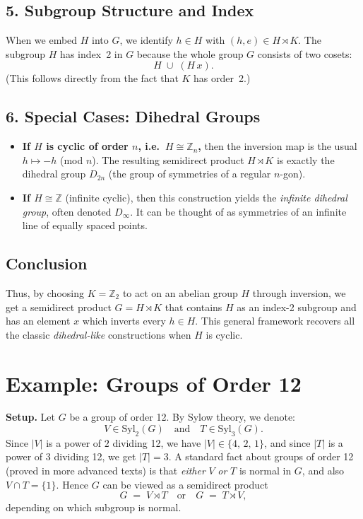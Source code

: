 \documentclass[12pt]{article}
\theoremstyle{definition} %
\theoremstyle{plain} %
\begin{document}
\subsection*{5. Subgroup Structure and Index}

When we embed $H$ into $G$, we identify $h \in H$ with $(h,e)\in H \rtimes K$. 
The subgroup $H$ has index~2 in $G$ because the whole group $G$ consists of two cosets:
\[
  H \;\cup\; (H\,x).
\]
(This follows directly from the fact that $K$ has order~2.)

\subsection*{6. Special Cases: Dihedral Groups}

\begin{itemize}
\item \textbf{If $H$ is cyclic of order $n$, i.e.\ $H \cong \mathbb{Z}_n$,} then the inversion map 
  is the usual $h \mapsto -h$ (mod $n$). The resulting semidirect product $H \rtimes K$ 
  is exactly the dihedral group $D_{2n}$ (the group of symmetries of a regular $n$-gon).
\item \textbf{If $H \cong \mathbb{Z}$} (infinite cyclic), then this construction yields 
  the \emph{infinite dihedral group}, often denoted $D_{\infty}$. 
  It can be thought of as symmetries of an infinite line of equally spaced points.
\end{itemize}

\subsection*{Conclusion}

Thus, by choosing $K=\mathbb{Z}_2$ to act on an abelian group $H$ through inversion, 
we get a semidirect product $G=H \rtimes K$ that contains $H$ as an index-2 subgroup 
and has an element $x$ which inverts every $h\in H$. This general framework 
recovers all the classic \emph{dihedral-like} constructions when $H$ is cyclic.
\section*{Example: Groups of Order 12}

\textbf{Setup.}
Let $G$ be a group of order 12.  By Sylow theory, we denote:
\[
   V \in \mathrm{Syl}_2(G)
   \quad\text{and}\quad 
   T \in \mathrm{Syl}_3(G).
\]
Since $|V|$ is a power of $2$ dividing 12, we have $|V|\in\{4,\,2,\,1\}$, 
and since $|T|$ is a power of $3$ dividing 12, we get $|T|=3$.  
A standard fact about groups of order 12 (proved in more advanced texts) is that
\emph{either} $V$ \emph{or} $T$ is normal in $G$, and also $V \cap T = \{1\}$.  
Hence $G$ can be viewed as a semidirect product
\[
  G \;=\; V \rtimes T
  \quad\text{or}\quad 
  G \;=\; T \rtimes V,
\]
depending on which subgroup is normal.
\end{document}
